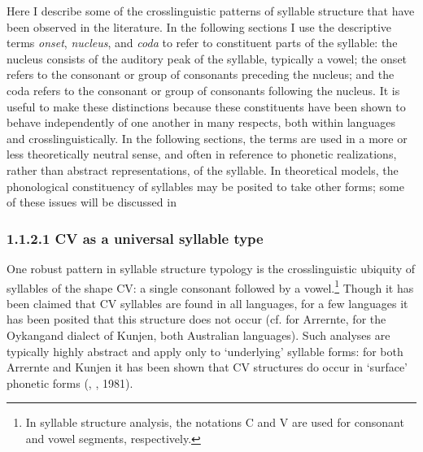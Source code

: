   Here I describe some of the crosslinguistic patterns of syllable structure that have been observed in the literature. In the following sections I use the descriptive terms \textit{onset}, \textit{nucleus}, and \textit{coda} to refer to constituent parts of the syllable: the nucleus consists of the auditory peak of the syllable, typically a vowel; the onset refers to the consonant or group of consonants preceding the nucleus; and the coda refers to the consonant or group of consonants following the nucleus. It is useful to make these distinctions because these constituents have been shown to behave independently of one another in many respects, both within languages and crosslinguistically. In the following sections, the terms are used in a more or less theoretically neutral sense, and often in reference to phonetic realizations, rather than abstract representations, of the syllable. In theoretical models, the phonological constituency of syllables may be posited to take other forms; some of these issues will be discussed in 


\subsubsection{\textbf{1.1.2.1} \textbf{CV} \textbf{as} \textbf{a} \textbf{universal} \textbf{syllable} \textbf{type}}

\textsf{} One robust pattern in syllable structure typology is the crosslinguistic ubiquity of syllables of the shape CV: a single consonant followed by a vowel.\footnote{ \textrm{In syllable structure analysis, the notations C and V are used for consonant and vowel segments, respectively.}} Though it has been claimed that CV syllables are found in all languages, for a few languages it has been posited that this structure does not occur (cf. \citealt{BreenPensalfini1999} for Arrernte, \citealt{Sommer1969} for the Oykangand dialect of Kunjen, both Australian languages). Such analyses are typically highly abstract and apply only to ‘underlying’ syllable forms: for both Arrernte and Kunjen it has been shown that CV structures do occur in ‘surface’ phonetic forms (\citealt{Anderson2000}, \citealt{Sommer1969}, 1981).



